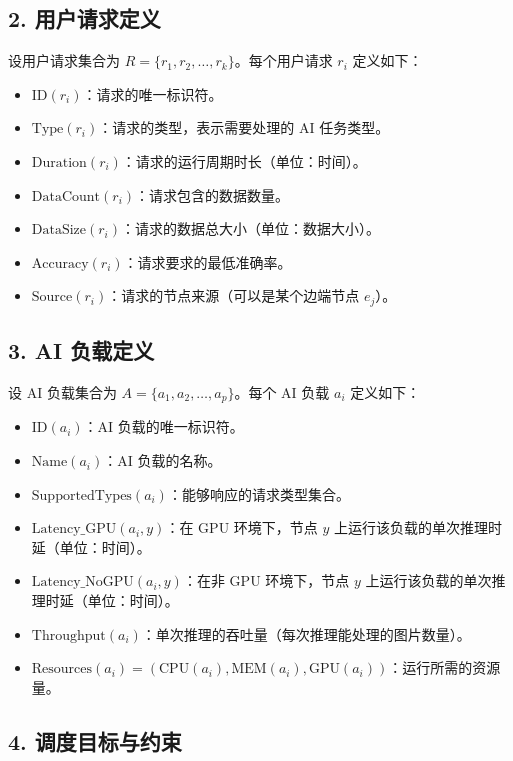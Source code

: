 \subsection*{2. 用户请求定义}
设用户请求集合为 \( R = \{r_1, r_2, \dots, r_k\} \)。每个用户请求 \( r_i \) 定义如下：
\begin{itemize}
    \item \(\text{ID}(r_i)\)：请求的唯一标识符。
    \item \(\text{Type}(r_i)\)：请求的类型，表示需要处理的 AI 任务类型。
    \item \(\text{Duration}(r_i)\)：请求的运行周期时长（单位：时间）。
    \item \(\text{DataCount}(r_i)\)：请求包含的数据数量。
    \item \(\text{DataSize}(r_i)\)：请求的数据总大小（单位：数据大小）。
    \item \(\text{Accuracy}(r_i)\)：请求要求的最低准确率。
    \item \(\text{Source}(r_i)\)：请求的节点来源（可以是某个边端节点 \( e_j \)）。
\end{itemize}

\subsection*{3. AI 负载定义}
设 AI 负载集合为 \( A = \{a_1, a_2, \dots, a_p\} \)。每个 AI 负载 \( a_i \) 定义如下：
\begin{itemize}
    \item \(\text{ID}(a_i)\)：AI 负载的唯一标识符。
    \item \(\text{Name}(a_i)\)：AI 负载的名称。
    \item \(\text{SupportedTypes}(a_i)\)：能够响应的请求类型集合。
    \item \(\text{Latency\_GPU}(a_i, y)\)：在 GPU 环境下，节点 \( y \) 上运行该负载的单次推理时延（单位：时间）。
    \item \(\text{Latency\_NoGPU}(a_i, y)\)：在非 GPU 环境下，节点 \( y \) 上运行该负载的单次推理时延（单位：时间）。
    \item \(\text{Throughput}(a_i)\)：单次推理的吞吐量（每次推理能处理的图片数量）。
    \item \(\text{Resources}(a_i) = (\text{CPU}(a_i), \text{MEM}(a_i), \text{GPU}(a_i))\)：运行所需的资源量。
\end{itemize}

\subsection*{4. 调度目标与约束}

